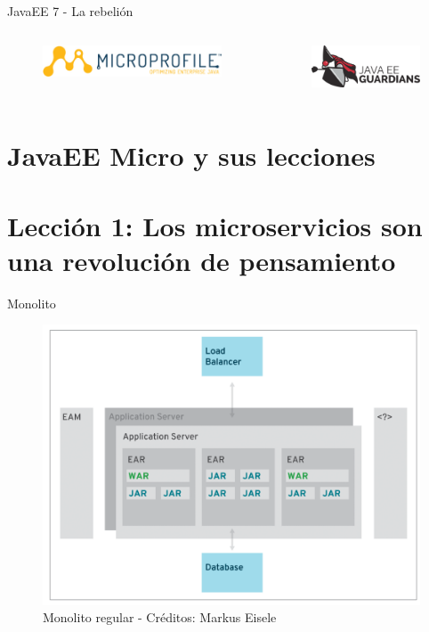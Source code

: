\documentclass{beamer}
\begin{document}
\begin{frame}{JavaEE 7 - La rebelión}
\begin{columns}
\begin{column}{0.5\textwidth}
\begin{figure}
\centering
\includegraphics[width=\linewidth]{Images/microprofile-logo}
\end{figure}
\end{column}
\begin{column}{0.5\textwidth}  %
\begin{figure}
\centering
\includegraphics[width=\linewidth]{Images/guardians}
\end{figure}
\end{column}
\end{columns}
\end{frame}

\section{JavaEE Micro y sus lecciones}



\section{Lección 1: Los microservicios son una revolución de pensamiento}
\begin{frame}{Monolito}
\begin{figure}
\centering
\includegraphics[width=0.7\linewidth]{Images/monolitos}
\caption{Monolito regular - Créditos: Markus Eisele}
\end{figure}
\end{frame}
\end{document}

